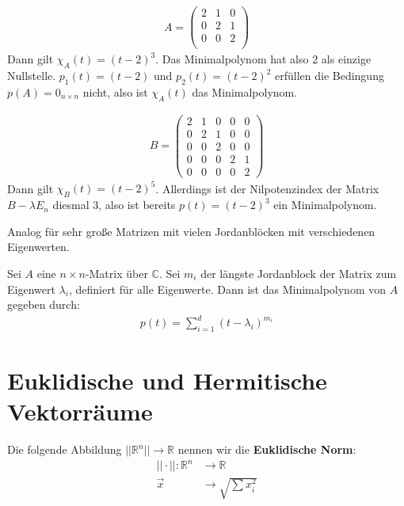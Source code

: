 \documentclass{report}
\newcommand*{\newpar}{\par\vspace{\baselineskip}\noindent}
\newcommand{\tbf}[1]{\textbf{#1}}
\newcommand{\bC}{\mathbb{C}}
\newcommand{\bR}{\mathbb{R}}
\newcommand{\vx}{\vec{x}}
\begin{document}
\begin{align*}
 A = \begin{pmatrix}
      2 & 1 & 0\\
      0 & 2 & 1\\
      0 & 0 & 2\\
     \end{pmatrix}
\end{align*}
Dann gilt $\chi_A(t) = (t-2)^3$. Das Minimalpolynom hat also $2$ als einzige Nullstelle. $p_1(t) = (t-2)$ und $p_2(t) = (t-2)^2$ erfüllen die Bedingung $p(A) = 0_{n \times n}$ nicht, also ist $\chi_A(t)$ das Minimalpolynom.
\newpar
\begin{align*}
 B = \begin{pmatrix}
      2 & 1 & 0 & 0 & 0\\
      0 & 2 & 1 & 0 & 0\\
      0 & 0 & 2 & 0 & 0\\
      0 & 0 & 0 & 2 & 1\\
      0 & 0 & 0 & 0 & 2
     \end{pmatrix}
\end{align*}
Dann gilt $\chi_B(t) = (t-2)^5$. Allerdings ist der Nilpotenzindex der Matrix $B - \lambda E_n$ diesmal $3$, also ist bereits $p(t) = (t-2)^3$ ein Minimalpolynom.
\newpar
Analog für sehr große Matrizen mit vielen Jordanblöcken mit verschiedenen Eigenwerten.
\begin{corollary}
Sei $A$ eine $n \times n$-Matrix über $\bC$. Sei $m_i$ der längste Jordanblock der Matrix zum Eigenwert $\lambda_i$, definiert für alle Eigenwerte. Dann ist das Minimalpolynom von $A$ gegeben durch:
\begin{align*}
 p(t) = \sum_{i=1}^{d} (t - \lambda_i)^{m_i}
\end{align*}
\end{corollary}
%
%
%
%
%
%
%
%
%
%
%
%
%
%
%
%
%
%
%
\chapter{Euklidische und Hermitische Vektorräume}
\begin{definition}
 Die folgende Abbildung $||\bR^n|| \to \bR$ nennen wir die \tbf{Euklidische Norm}:
 \begin{align*}
  || \cdot || : \bR^n &\to \bR\\
  \vx &\to \sqrt{\sum x_i^2}
 \end{align*}
\end{definition}
\end{document}

